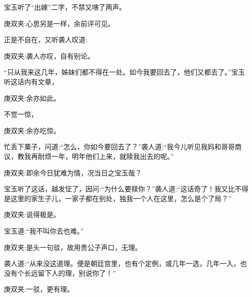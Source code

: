 \begin{parag}
\end{parag}


\begin{parag}
    宝玉听了“出嫁”二字，不禁又嗐了两声。\begin{note}庚双夹:心思另是一样，余前评可见。\end{note}正是不自在，又听袭人叹道:\begin{note}庚双夹:袭人亦叹，自有别论。\end{note}“只从我来这几年，姊妹们都不得在一处。如今我要回去了，他们又都去了。”宝玉听这话内有文章，\begin{note}庚双夹:余亦如此。\end{note}不觉一惊，\begin{note}庚双夹:余亦吃惊。\end{note}忙丢下粟子，问道:“怎么，你如今要回去了？”袭人道:“我今儿听见我妈和哥哥商议，教我再耐烦一年，明年他们上来，就赎我出去的呢。”\begin{note}庚双夹:即余今日犹难为情，况当日之宝玉哉？\end{note}宝玉听了这话，越发怔了，因问:“为什么要赎你？”袭人道:“这话奇了！我又比不得是这里的家生子儿，一家子都在别处，独我一个人在这里，怎么是个了局？”\begin{note}庚双夹:说得极是。\end{note}宝玉道:“我不叫你去也难。”\begin{note}庚双夹:是头一句驳，故用贵公子声口，无理。\end{note}袭人道:“从来没这道理。便是朝廷宫里，也有个定例，或几年一选，几年一入，也没有个长远留下人的理，别说你了！”\begin{note}庚双夹:一驳，更有理。\end{note}
\end{parag}


